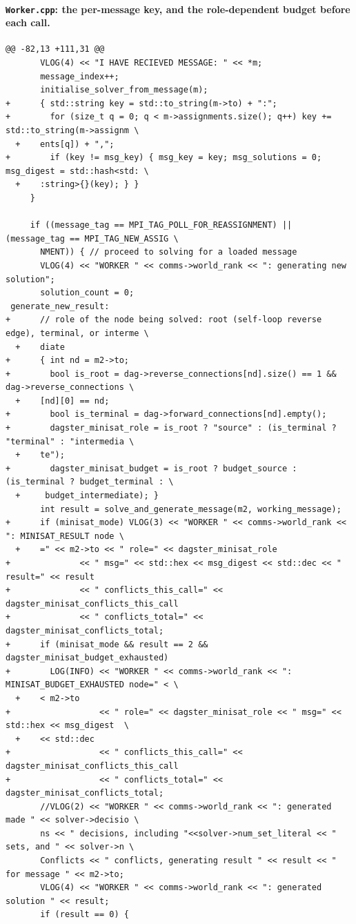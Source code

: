 \documentclass[11pt,a4paper]{article}
\begin{document}
\paragraph{\texttt{Worker.cpp}: the per-message key, and the role-dependent budget before each call.}
{\scriptsize\begin{verbatim}
@@ -82,13 +111,31 @@
       VLOG(4) << "I HAVE RECIEVED MESSAGE: " << *m;
       message_index++;
       initialise_solver_from_message(m);
+      { std::string key = std::to_string(m->to) + ":";
+        for (size_t q = 0; q < m->assignments.size(); q++) key += std::to_string(m->assignm \
  +    ents[q]) + ",";
+        if (key != msg_key) { msg_key = key; msg_solutions = 0; msg_digest = std::hash<std: \
  +    :string>{}(key); } }
     }
     
     if ((message_tag == MPI_TAG_POLL_FOR_REASSIGNMENT) || (message_tag == MPI_TAG_NEW_ASSIG \
       NMENT)) { // proceed to solving for a loaded message
       VLOG(4) << "WORKER " << comms->world_rank << ": generating new solution";
       solution_count = 0;
 generate_new_result:
+      // role of the node being solved: root (self-loop reverse edge), terminal, or interme \
  +    diate
+      { int nd = m2->to;
+        bool is_root = dag->reverse_connections[nd].size() == 1 && dag->reverse_connections \
  +    [nd][0] == nd;
+        bool is_terminal = dag->forward_connections[nd].empty();
+        dagster_minisat_role = is_root ? "source" : (is_terminal ? "terminal" : "intermedia \
  +    te");
+        dagster_minisat_budget = is_root ? budget_source : (is_terminal ? budget_terminal : \
  +     budget_intermediate); }
       int result = solve_and_generate_message(m2, working_message);
+      if (minisat_mode) VLOG(3) << "WORKER " << comms->world_rank << ": MINISAT_RESULT node \
  +    =" << m2->to << " role=" << dagster_minisat_role
+              << " msg=" << std::hex << msg_digest << std::dec << " result=" << result
+              << " conflicts_this_call=" << dagster_minisat_conflicts_this_call
+              << " conflicts_total=" << dagster_minisat_conflicts_total;
+      if (minisat_mode && result == 2 && dagster_minisat_budget_exhausted)
+        LOG(INFO) << "WORKER " << comms->world_rank << ": MINISAT_BUDGET_EXHAUSTED node=" < \
  +    < m2->to
+                  << " role=" << dagster_minisat_role << " msg=" << std::hex << msg_digest  \
  +    << std::dec
+                  << " conflicts_this_call=" << dagster_minisat_conflicts_this_call
+                  << " conflicts_total=" << dagster_minisat_conflicts_total;
       //VLOG(2) << "WORKER " << comms->world_rank << ": generated made " << solver->decisio \
       ns << " decisions, including "<<solver->num_set_literal << " sets, and " << solver->n \
       Conflicts << " conflicts, generating result " << result << " for message " << m2->to;
       VLOG(4) << "WORKER " << comms->world_rank << ": generated solution " << result;
       if (result == 0) {
\end{verbatim}}
\end{document}

